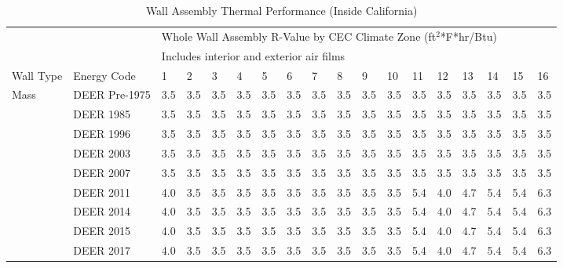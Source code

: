 \begin{table}
\scriptsize
\caption[Wall Assembly Thermal Performance (Inside California)]{Wall Assembly Thermal Performance (Inside California)}
\label{tab:wall_r_values_deer}
\centering
\begin{tabular}{p{0.4in}p{0.7in}p{0.1in}p{0.1in}p{0.1in}p{0.1in}p{0.1in}p{0.1in}p{0.1in}p{0.1in}p{0.1in}p{0.1in}p{0.1in}p{0.1in}p{0.1in}p{0.1in}p{0.1in}p{0.1in}}
\hline
            &               & \multicolumn{16}{l}{Whole Wall Assembly R-Value by CEC Climate Zone (ft$^2$*F*hr/Btu)}  \\
            \multicolumn{2}{l}{} & \multicolumn{12}{l}{Includes interior and exterior air films} &\multicolumn{1}{l}{} \\ \hline
Wall Type   & Energy Code   & 1    & 2    & 3    & 4    & 5    & 6    & 7    & 8    & 9    & 10   & 11   & 12   & 13   & 14   & 15   & 16                      \\ \hline
Mass        & DEER Pre-1975 & 3.5  & 3.5  & 3.5  & 3.5  & 3.5  & 3.5  & 3.5  & 3.5  & 3.5  & 3.5  & 3.5  & 3.5  & 3.5  & 3.5  & 3.5  & 3.5                     \\
            & DEER 1985     & 3.5  & 3.5  & 3.5  & 3.5  & 3.5  & 3.5  & 3.5  & 3.5  & 3.5  & 3.5  & 3.5  & 3.5  & 3.5  & 3.5  & 3.5  & 3.5                     \\
            & DEER 1996     & 3.5  & 3.5  & 3.5  & 3.5  & 3.5  & 3.5  & 3.5  & 3.5  & 3.5  & 3.5  & 3.5  & 3.5  & 3.5  & 3.5  & 3.5  & 3.5                     \\
            & DEER 2003     & 3.5  & 3.5  & 3.5  & 3.5  & 3.5  & 3.5  & 3.5  & 3.5  & 3.5  & 3.5  & 3.5  & 3.5  & 3.5  & 3.5  & 3.5  & 3.5                     \\
            & DEER 2007     & 3.5  & 3.5  & 3.5  & 3.5  & 3.5  & 3.5  & 3.5  & 3.5  & 3.5  & 3.5  & 3.5  & 3.5  & 3.5  & 3.5  & 3.5  & 3.5                     \\
            & DEER 2011     & 4.0  & 3.5  & 3.5  & 3.5  & 3.5  & 3.5  & 3.5  & 3.5  & 3.5  & 3.5  & 5.4  & 4.0  & 4.7  & 5.4  & 5.4  & 6.3                     \\
            & DEER 2014     & 4.0  & 3.5  & 3.5  & 3.5  & 3.5  & 3.5  & 3.5  & 3.5  & 3.5  & 3.5  & 5.4  & 4.0  & 4.7  & 5.4  & 5.4  & 6.3                     \\
            & DEER 2015     & 4.0  & 3.5  & 3.5  & 3.5  & 3.5  & 3.5  & 3.5  & 3.5  & 3.5  & 3.5  & 5.4  & 4.0  & 4.7  & 5.4  & 5.4  & 6.3                     \\
            & DEER 2017     & 4.0  & 3.5  & 3.5  & 3.5  & 3.5  & 3.5  & 3.5  & 3.5  & 3.5  & 3.5  & 5.4  & 4.0  & 4.7  & 5.4  & 5.4  & 6.3                     \\

\end{tabular}
\end{table}
